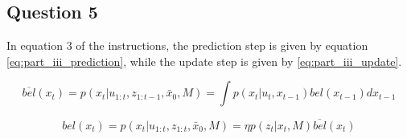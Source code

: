 \subsection{Question 5}
	In equation 3 of the instructions, the prediction step is given by equation \ref{eq:part_iii_prediction}, 
	while the update step is given by \ref{eq:part_iii_update}.
	
	\begin{equation}
		\overline{bel}(x_t) = p(x_t | u_{1:t}, z_{1:t-1}, \bar{x}_0, M) = \int p(x_t | u_t, x_{t-1}) bel(x_{t-1}) dx_{t-1}
		\label{eq:part_iii_prediction}
	\end{equation}
	
	\begin{equation}
		bel(x_t) = p(x_t | u_{1:t}, z_{1:t}, \bar{x}_0, M) = \eta p(z_t | x_t, M) \overline{bel}(x_t)
		\label{eq:part_iii_update}
	\end{equation}